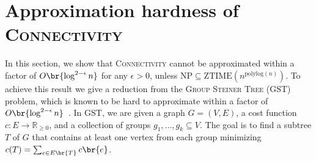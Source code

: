 \section{Approximation hardness of \textsc{Connectivity}}
In this section, we show that \textsc{Connectivity} cannot be approximated within a factor of $O\br{\log^{2-\epsilon} n}$ for any $\epsilon > 0$, unless $\text{NP} \subseteq \text{ZTIME}(n^{\text{polylog}(n)})$. To achieve this result we give a reduction from the \textsc{Group Steiner Tree} (\textsc{GST}) problem, which is known to be hard to approximate within a factor of $O\br{\log^{2-\epsilon} n}$~\cite{PolylogarithmicInapproximability}. In \textsc{GST}, we are given a graph $G = (V, E)$, a cost function $c: E \to \mathbb{R}_{\geq 0}$, and a collection of groups $g_1, \dots, g_k \subseteq V$. The goal is to find a subtree $T$ of $G$ that contains at least one vertex from each group minimizing $c(T)=\sum_{e\in E\br{T}}c\br{e}$. 

